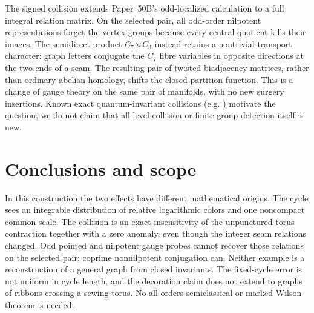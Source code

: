 \documentclass[11pt,a4paper]{article}
\theoremstyle{remark}\newtheorem{remark}[theorem]{Remark}
\begin{document}
The signed collision extends Paper~50B's odd-localized calculation to a
full integral relation matrix. On the selected pair, all odd-order
nilpotent representations forget the vertex groups because every
central quotient kills their images. The semidirect product
\(C_7\rtimes C_3\) instead retains a nontrivial transport character:
graph letters conjugate the \(C_7\) fibre variables in opposite
directions at the two ends of a seam. The resulting pair of twisted
biadjacency matrices, rather than ordinary abelian homology, shifts the
closed partition function. This is a change of gauge theory on the
same pair of manifolds, with no new surgery insertions. Known exact
quantum-invariant collisions (e.g. \cite{Funar}) motivate the question;
we do not claim that all-level collision or finite-group detection
itself is new.






\section{Conclusions and scope}

In this construction the two effects have different mathematical
origins. The cycle sees an integrable distribution of relative
logarithmic colors and one noncompact common scale. The collision is
an exact insensitivity of the unpunctured torus contraction together
with a zero anomaly, even though the integer seam relations changed.
Odd pointed and nilpotent gauge probes cannot recover those relations
on the selected pair; coprime nonnilpotent conjugation can. Neither
example is a reconstruction of a general graph from closed invariants.
The fixed-cycle error is not uniform in cycle length, and the
decoration claim does not extend to graphs of ribbons crossing a
sewing torus. No all-orders semiclassical or marked Wilson theorem is
needed.
\end{document}
